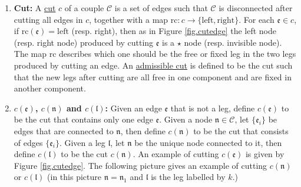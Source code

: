 \begin{defn}
\begin{enumerate}
 \item \textbf{Cut:} A \underline{cut} $c$ of a couple $\mathcal{C}$ is a set of edges such that $\mathcal{C}$ is disconnected after cutting all edges in $c$, together with a map $\text{rc}:c\rightarrow \{\text{left}, \text{right}\}$. For each $\mathfrak{e}\in c$, if $\text{rc}(\mathfrak{e})=\text{left}$ (resp. right), then as in Figure \ref{fig.cutedge} the left node (resp. right node) produced by cutting $\mathfrak{e}$ is a $\star$ node (resp. invisible node). The map $\text{rc}$ describes which one should be the free or fixed leg in the two legs produced by cutting an edge. An \underline{admissible cut} is defined to be the cut such that the new legs after cutting are all free in one component and are fixed in another component. 
 \item \textbf{$c(\mathfrak{e})$, $c(\mathfrak{n})$ and $c(\mathfrak{l})$:} Given an edge $\mathfrak{e}$ that is not a leg, define $c(\mathfrak{e})$ to be the cut that contains only one edge $\mathfrak{e}$. Given a node $\mathfrak{n}\in \mathcal{C}$, let $\{\mathfrak{e}_{i}\}$ be edges that are connected to $\mathfrak{n}$, then define $c(\mathfrak{n})$ to be the cut that consists of edges $\{\mathfrak{e}_{i}\}$. Given a leg $\mathfrak{l}$, let $\mathfrak{n}$ be the unique node connected to it, then define $c(\mathfrak{l})$ to be the cut $c(\mathfrak{n})$. An example of cutting $c(\mathfrak{e})$ is given by Figure \ref{fig.cutedge}. The following picture gives an example of cutting $c(\mathfrak{n})$ or $c(\mathfrak{l})$ (in this picture $\mathfrak{n}=\mathfrak{n}_1$ and $\mathfrak{l}$ is the leg labelled by $k$.)
 
 \begin{figure}[H]
 \centering
\end{figure}
\end{enumerate}
\end{defn}
